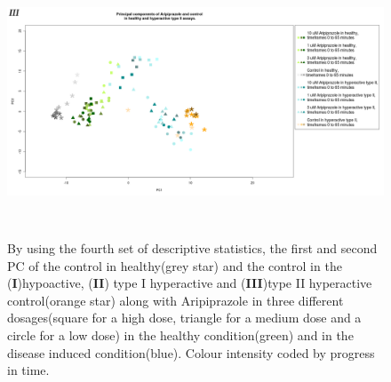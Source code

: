 \documentclass[a4paper,12pt]{article}
\begin{document}
\begin{figure}[h!]
\begin{center}
\includegraphics[width=16cm,height=8cm]{Aripiprazole_Control_DarkPTZ_turn_only_stratified.png}
\caption{By using the fourth set of descriptive statistics, the first and second PC of the control in healthy(grey star) and the control in the (\textbf{I})hypoactive, (\textbf{II}) type I hyperactive and (\textbf{III})type II hyperactive control(orange star) along with Aripiprazole in three different dosages(square for a high dose, triangle for a medium dose and a circle for a low dose) in the healthy condition(green) and in the disease induced condition(blue). Colour intensity coded by progress in time.}
\end{center}
\end{figure}
\newpage
\end{document}
